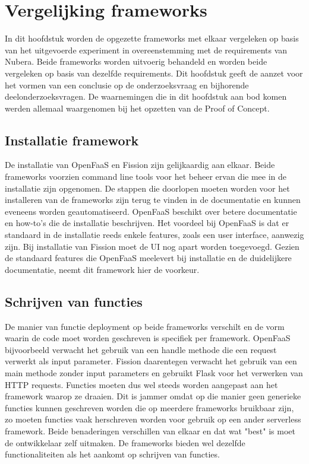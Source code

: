 \chapter{Vergelijking frameworks}
\label{ch:vergelijking-frameworks}
In dit hoofdstuk worden de opgezette frameworks met elkaar vergeleken op basis van het uitgevoerde experiment in overeenstemming met de requirements van Nubera. Beide frameworks worden uitvoerig behandeld en worden beide vergeleken op basis van dezelfde requirements. Dit hoofdstuk geeft de aanzet voor het vormen van een conclusie op de onderzoeksvraag en bijhorende deelonderzoeksvragen. De waarnemingen die in dit hoofdstuk aan bod komen werden allemaal waargenomen bij het opzetten van de Proof of Concept.

\section{Installatie framework}
\label{sec:vergelijking-installatie}
De installatie van OpenFaaS en Fission zijn gelijkaardig aan elkaar. Beide frameworks voorzien command line tools voor het beheer ervan die mee in de installatie zijn opgenomen. De stappen die doorlopen moeten worden voor het installeren van de frameworks zijn terug te vinden in de documentatie en kunnen eveneens worden geautomatiseerd. OpenFaaS beschikt over betere documentatie en how-to's die de installatie beschrijven. Het voordeel bij OpenFaaS is dat er standaard in de installatie reeds enkele features, zoals een user interface, aanwezig zijn. Bij installatie van Fission moet de UI nog apart worden toegevoegd. Gezien de standaard features die OpenFaaS meelevert bij installatie en de duidelijkere documentatie, neemt dit framework hier de voorkeur.

\section{Schrijven van functies}
De manier van functie deployment op beide frameworks verschilt en de vorm waarin de code moet worden geschreven is specifiek per framework. OpenFaaS bijvoorbeeld verwacht het gebruik van een handle methode die een request verwerkt als input parameter. Fission daarentegen verwacht het gebruik van een main methode zonder input parameters en gebruikt Flask voor het verwerken van HTTP requests. Functies moeten dus wel steeds worden aangepast aan het framework waarop ze draaien. Dit is jammer omdat op die manier geen generieke functies kunnen geschreven worden die op meerdere frameworks bruikbaar zijn, zo moeten functies vaak herschreven worden voor gebruik op een ander serverless framework. Beide benaderingen verschillen van elkaar en dat wat "best" is moet de ontwikkelaar zelf uitmaken. De frameworks bieden wel dezelfde functionaliteiten als het aankomt op schrijven van functies.

